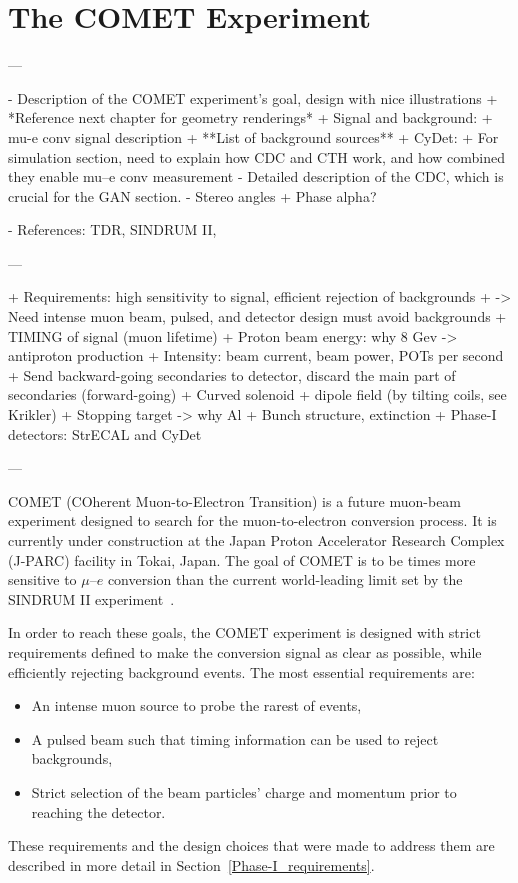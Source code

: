 \chapter{The COMET Experiment}\label{chapter2}

\begin{markdown}
---

- Description of the COMET experiment's goal, design with nice illustrations
    + *Reference next chapter for geometry renderings*
    + Signal and background:
        + mu-e conv signal description
        + **List of background sources**
+ CyDet:
    + For simulation section, need to explain how CDC and CTH work, and how combined they enable mu--e conv measurement
    - Detailed description of the CDC, which is crucial for the GAN section.
     - Stereo angles
+ Phase alpha?

- References: TDR, SINDRUM II, 

---

+ Requirements: high sensitivity to signal, efficient rejection of backgrounds
 + -> Need intense muon beam, pulsed, and detector design must avoid backgrounds
+ TIMING of signal (muon lifetime)
+ Proton beam energy: why 8 Gev -> antiproton production
+ Intensity: beam current, beam power, POTs per second
+ Send backward-going secondaries to detector, discard the main part of secondaries (forward-going)
+ Curved solenoid + dipole field (by tilting coils, see Krikler)
+ Stopping target -> why Al
+ Bunch structure, extinction
+ Phase-I detectors: StrECAL and CyDet

---
\end{markdown}

COMET (COherent Muon-to-Electron Transition) is a future muon-beam experiment
designed to search for the muon-to-electron conversion process. It is currently
under construction at the Japan Proton Accelerator Research Complex (J-PARC)
facility in Tokai, Japan. The goal of COMET is to be  times more
sensitive to $\mu$--$e$ conversion than the current world-leading limit set by
the SINDRUM II experiment~\cite{Bertl:2006up}. 

In order to reach these goals, the COMET experiment is designed with strict
requirements defined to make the conversion signal as clear as possible, while
efficiently rejecting background events. The most essential requirements are:
\begin{itemize}
    \item An intense muon source to probe the rarest of events,
    \item A pulsed beam such that timing information can be used to reject backgrounds,
    \item Strict selection of the beam particles' charge and momentum prior to reaching
    the detector.
\end{itemize}
These requirements and the design choices that were made to address them are
described in more detail in Section~\ref{Phase-I_requirements}.


